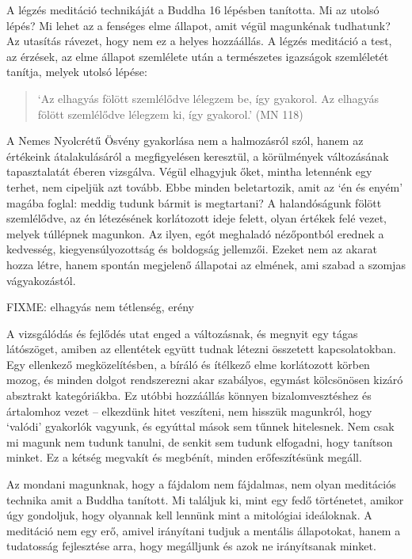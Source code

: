 A légzés meditáció technikáját a Buddha 16 lépésben tanította. Mi az
utolsó lépés? Mi lehet az a fenséges elme állapot, amit végül magunkénak
tudhatunk? Az utasítás rávezet, hogy nem ez a helyes hozzáállás. A
légzés meditáció a test, az érzések, az elme állapot szemlélete után a
természetes igazságok szemléletét tanítja, melyek utolsó lépése:

\begin{quote}
`Az elhagyás fölött szemlélődve lélegzem be, így gyakorol. Az elhagyás
fölött szemlélődve lélegzem ki, így gyakorol.' (MN 118)
\end{quote}

A Nemes Nyolcrétű Ösvény gyakorlása nem a halmozásról szól, hanem az
értékeink átalakulásáról a megfigyelésen keresztül, a körülmények
változásának tapasztalatát éberen vizsgálva. Végül elhagyjuk őket,
mintha letennénk egy terhet, nem cipeljük azt tovább. Ebbe minden
beletartozik, amit az `én és enyém' magába foglal: meddig tudunk bármit
is megtartani? A halandóságunk fölött szemlélődve, az én létezésének
korlátozott ideje felett, olyan értékek felé vezet, melyek túllépnek
magunkon. Az ilyen, egót meghaladó nézőpontból erednek a kedvesség,
kiegyensúlyozottság és boldogság jellemzői. Ezeket nem az akarat hozza
létre, hanem spontán megjelenő állapotai az elmének, ami szabad a
szomjas vágyakozástól.

FIXME: elhagyás nem tétlenség, erény

A vizsgálódás és fejlődés utat enged a változásnak, és megnyit egy tágas
látószöget, amiben az ellentétek együtt tudnak létezni összetett
kapcsolatokban. Egy ellenkező megközelítésben, a bíráló és ítélkező elme
korlátozott körben mozog, és minden dolgot rendszerezni akar szabályos,
egymást kölcsönösen kizáró absztrakt kategóriákba. Ez utóbbi hozzáállás
könnyen bizalomvesztéshez és ártalomhoz vezet -- elkezdünk hitet
veszíteni, nem hisszük magunkról, hogy `valódi' gyakorlók vagyunk, és
egyúttal mások sem tűnnek hitelesnek. Nem csak mi magunk nem tudunk
tanulni, de senkit sem tudunk elfogadni, hogy tanítson minket. Ez a
kétség megvakít és megbénít, minden erőfeszítésünk megáll.

Az mondani magunknak, hogy a fájdalom nem fájdalmas, nem olyan
meditációs technika amit a Buddha tanított. Mi találjuk ki, mint egy
fedő történetet, amikor úgy gondoljuk, hogy olyannak kell lennünk mint a
mitológiai ideáloknak. A meditáció nem egy erő, amivel irányítani tudjuk
a mentális állapotokat, hanem a tudatosság fejlesztése arra, hogy
megálljunk és azok ne irányítsanak minket.

